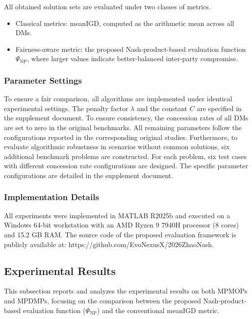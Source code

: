 \documentclass[journal]{IEEEtran}
\begin{document}
All obtained solution sets are evaluated under two classes of metrics.
\begin{itemize}
	\item Classical metrics: meanIGD, computed as the arithmetic mean across all DMs.
	\item Fairness-aware metric: the proposed Nash-product-based evaluation function $\Psi_{\mathrm{NP}}$, where larger values indicate better-balanced inter-party compromise.
\end{itemize}

\subsubsection{Parameter Settings}

To ensure a fair comparison, all algorithms are implemented under identical experimental settings. The penalty factor $\lambda$ and the constant $C$ are specified in the supplement document. To ensure consistency, the concession rates of all DMs are set to zero in the original benchmarks. All remaining parameters follow the configurations reported in the corresponding original studies. Furthermore, to evaluate algorithmic robustness in scenarios without common solutions, six additional benchmark problems are constructed. For each problem, six test cases with different concession rate configurations are designed. The specific parameter configurations are detailed in the supplement document.

\subsubsection{Implementation Details}

All experiments were implemented in MATLAB R2025b and executed on a Windows 64-bit workstation with an AMD Ryzen 9 7940H processor (8 cores) and 15.2 GB RAM. The source code of the proposed evaluation framework is publicly available at: https://github.com/EvoNexusX/2026ZhaoNash.

\subsection{Experimental Results}

This subsection reports and analyzes the experimental results on both MPMOPs and MPDMPs, focusing on the comparison between the proposed Nash-product-based evaluation function ($\Psi_\mathrm{NP}$) and the conventional meanIGD metric.
\end{document}

